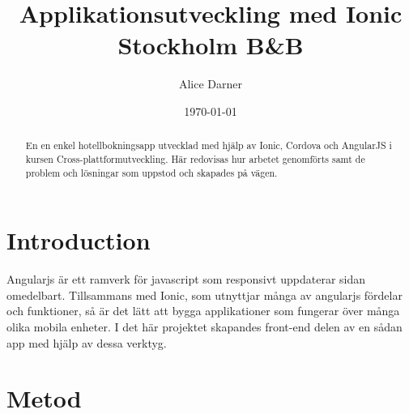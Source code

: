 \documentclass[a4paper]{article}
\title{Applikationsutveckling med Ionic \\ Stockholm B\&B }
\author{Alice Darner}
\date{\today}
\begin{document}
\maketitle

\begin{abstract}
En en enkel hotellbokningsapp utvecklad med hjälp av Ionic, Cordova och AngularJS i kursen Cross-plattformutveckling. Här redovisas hur arbetet genomförts samt de problem och lösningar som uppstod och skapades på vägen.
\end{abstract}

\section{Introduction}
\label{sec:introduction}

Angularjs är ett ramverk för javascript som responsivt uppdaterar sidan omedelbart. Tillsammans med Ionic, som utnyttjar många av angularjs fördelar och funktioner, så är det lätt att bygga applikationer som fungerar över många olika mobila enheter. I det här projektet skapandes front-end delen av en sådan app med hjälp av dessa verktyg. 

\section{Metod}
\end{document}
